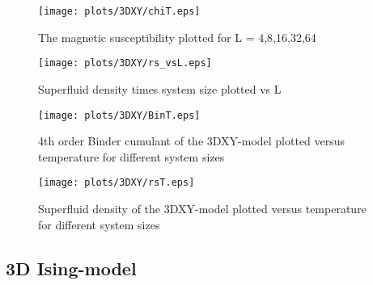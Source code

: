 \documentclass[a4paper]{article}
\begin{document}
\begin{figure}[!htpb]
  \centering
  \texttt{[image: plots/3DXY/chiT.eps]} 
  \caption{The magnetic susceptibility plotted for L = 4,8,16,32,64}
  \label{fig:chi8}
\end{figure}
\begin{figure}[!htpb]
  \centering
  \texttt{[image: plots/3DXY/rs\_vsL.eps]} 
  \caption{Superfluid density times system size plotted vs L}
  \label{fig:rs_vsL}
\end{figure}
\begin{figure}[!htpb]
  \centering
  \texttt{[image: plots/3DXY/BinT.eps]} 
  \caption{4th order Binder cumulant of the 3DXY-model plotted versus temperature for different system sizes}
  \label{fig:binT}
\end{figure}
\begin{figure}[!htpb]
  \centering
  \texttt{[image: plots/3DXY/rsT.eps]} 
  \caption{Superfluid density of the 3DXY-model plotted versus temperature for different system sizes}
  \label{fig:binT}
\end{figure}
\clearpage
\subsection{3D Ising-model}
\end{document}
